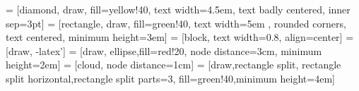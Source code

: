 \usepackage{latexsym,multicol,color,pstricks}

\headheight 15pt

 = [diamond, draw, fill=yellow!40, text width=4.5em, text badly centered, inner sep=3pt]
 = [rectangle, draw, fill=green!40, text width=5em	, rounded corners, text centered, minimum height=3em]
 = [block, text width=0.8\textwidth, align=center]
 = [draw, -latex']
 = [draw, ellipse,fill=red!20, node distance=3cm, minimum height=2em]
 = [cloud, node distance=1cm]
 = [draw,rectangle split, rectangle split horizontal,rectangle split parts=3, fill=green!40,minimum height=4em]

